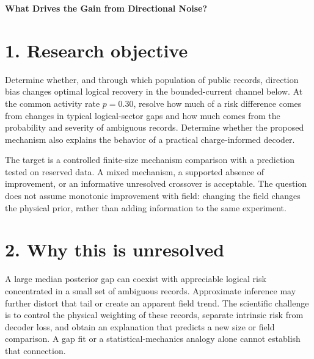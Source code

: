 \documentclass[11pt,letterpaper]{article}
\begin{document}
\fontsize{10.5}{12.7}\selectfont
{\raggedright{}\fontsize{24}{28}\selectfont\sffamily\bfseries What Drives the Gain from Directional Noise?\par}


\vspace{8pt}

\section*{1. Research objective}

Determine whether, and through which population of public records, direction bias changes optimal logical recovery in the bounded-current channel below. At the common activity rate $p=0.30$, resolve how much of a risk difference comes from changes in typical logical-sector gaps and how much comes from the probability and severity of ambiguous records. Determine whether the proposed mechanism also explains the behavior of a practical charge-informed decoder.\par

The target is a controlled finite-size mechanism comparison with a prediction tested on reserved data. A mixed mechanism, a supported absence of improvement, or an informative unresolved crossover is acceptable. The question does not assume monotonic improvement with field: changing the field changes the physical prior, rather than adding information to the same experiment.\par

\section*{2. Why this is unresolved}

A large median posterior gap can coexist with appreciable logical risk concentrated in a small set of ambiguous records. Approximate inference may further distort that tail or create an apparent field trend. The scientific challenge is to control the physical weighting of these records, separate intrinsic risk from decoder loss, and obtain an explanation that predicts a new size or field comparison. A gap fit or a statistical-mechanics analogy alone cannot establish that connection.\par
\end{document}
